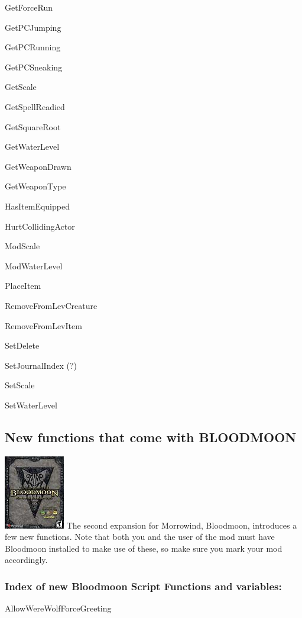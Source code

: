 \documentclass[
]{article}
\begin{document}
GetForceRun

GetPCJumping

GetPCRunning

GetPCSneaking

GetScale

GetSpellReadied

GetSquareRoot

GetWaterLevel

GetWeaponDrawn

GetWeaponType

HasItemEquipped

HurtCollidingActor

ModScale

ModWaterLevel

PlaceItem

RemoveFromLevCreature

RemoveFromLevItem

SetDelete

SetJournalIndex (?)

SetScale

SetWaterLevel

\hypertarget{new-functions-that-come-with-bloodmoon}{%
\subsection{New functions that come with
BLOODMOON}\label{new-functions-that-come-with-bloodmoon}}

\includegraphics{media/image7.png} The second expansion for Morrowind,
Bloodmoon, introduces a few new functions. Note that both you and the
user of the mod must have Bloodmoon installed to make use of these, so
make sure you mark your mod accordingly.

\hypertarget{index-of-new-bloodmoon-script-functions-and-variables}{%
\subsubsection{Index of new Bloodmoon Script Functions and
variables:}\label{index-of-new-bloodmoon-script-functions-and-variables}}

AllowWereWolfForceGreeting
\end{document}
